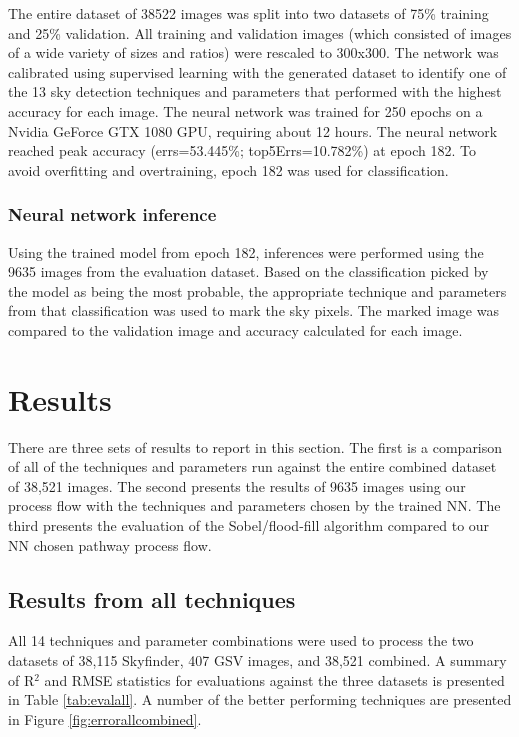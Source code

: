 \documentclass[final,3p,times,authoryear]{elsarticle}
\begin{document}
The entire dataset of 38522 images was split into two datasets of 75\% training and 25\% validation. All training and validation images (which consisted of images of a wide variety of sizes and ratios) were rescaled to 300x300. The network was calibrated using supervised learning with the generated dataset to identify one of the 13 sky detection techniques and parameters that performed with the highest accuracy for each image. The neural network was trained for 250 epochs on a Nvidia GeForce GTX 1080 GPU, requiring about 12 hours. The neural network reached peak accuracy (errs=53.445\%; top5Errs=10.782\%) at epoch 182. To avoid overfitting and overtraining, epoch 182 was used for classification.


\subsubsection{Neural network inference}\label{sec:nninference}    
Using the trained model from epoch 182, inferences were performed using the 9635 images from the evaluation dataset. Based on the classification picked by the model as being the most probable, the appropriate technique and parameters from that classification was used to mark the sky pixels. The marked image was compared to the validation image and accuracy calculated for each image.

\section{Results}\label{sec:results}


There are three sets of results to report in this section. The first is a comparison of all of the techniques and parameters run against the entire combined dataset of 38,521 images. The second presents the results of 9635 images using our process flow with the techniques and parameters chosen by the trained NN. The third presents the evaluation of the Sobel/flood-fill algorithm compared to our NN chosen pathway process flow.

\subsection{Results from all techniques}\label{sec:resultsall}
All 14 techniques and parameter combinations were used to process the two datasets of 38,115 Skyfinder, 407 GSV images, and 38,521 combined. A summary of R$^{2}$ and RMSE statistics for evaluations against the three datasets is presented in Table \ref{tab:evalall}. A number of the better performing techniques are presented in Figure \ref{fig:errorallcombined}.
\end{document}
